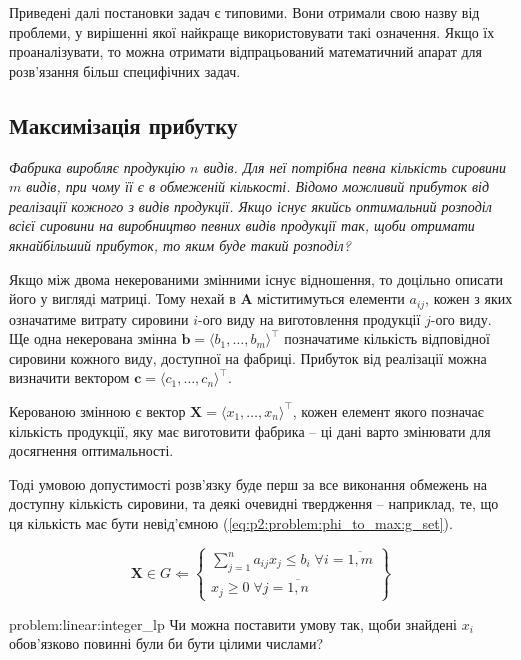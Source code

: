 \documentclass[\main/book.tex]{subfiles}
\begin{document}
Приведені далі постановки задач є типовими. Вони отримали свою назву від проблеми, у вирішенні якої найкраще використовувати такі означення. Якщо їх проаналізувати, то можна отримати відпрацьований математичний апарат для розв'язання більш специфічних задач.

\subsection{Максимізація прибутку}
\label{section:linear:phi_to_max}

\textit{Фабрика виробляє продукцію $n$ видів. Для неї потрібна певна кількість сировини $m$ видів, при чому її є в обмеженій кількості. Відомо можливий прибуток від реалізації кожного з видів продукції. Якщо існує якийсь оптимальний розподіл всієї сировини на виробництво певних видів продукції так, щоби отримати якнайбільший прибуток, то яким буде такий розподіл?}

Якщо між двома некерованими змінними існує відношення, то доцільно описати його у вигляді матриці. Тому нехай в $\mathbf{A}$ міститимуться елементи $a_{ij}$, кожен з яких означатиме витрату сировини $i$-ого виду на виготовлення продукції $j$-ого виду. Ще одна некерована змінна $\mathbf{b} = \langle b_1, \ldots, b_m \rangle^\top$ позначатиме кількість відповідної сировини кожного виду, доступної на фабриці. Прибуток від реалізації можна визначити вектором $\mathbf{c} = \langle c_1, \ldots, c_n \rangle^\top$.

Керованою змінною є вектор $\mathbf{X} = \langle x_1, \ldots, x_n \rangle^\top$, кожен елемент якого позначає кількість продукції, яку має виготовити фабрика -- ці дані варто змінювати для досягнення оптимальності.

Тоді умовою допустимості розв'язку буде перш за все виконання обмежень на доступну кількість сировини, та деякі очевидні твердження -- наприклад, те, що ця кількість має бути невід'ємною (\ref{eq:p2:problem:phi_to_max:g_set}).

\begin{equation}
 \mathbf{X} \in G \Leftarrow
 \left\{
  \begin{array}{l}
   \displaystyle \sum_{j=1}^n a_{ij} x_j \leq b_i\;
   \forall i = \overline{1, m} \\
   x_j \geq 0 \; \forall j = \overline{1, n}
  \end{array}
 \right\}
 \label{eq:p2:problem:phi_to_max:g_set}
\end{equation}

\begin{problem}{problem:linear:integer_lp}
Чи можна поставити умову так, щоби знайдені $x_i$ обов'язково повинні були би бути цілими числами?
\end{problem}
\end{document}
